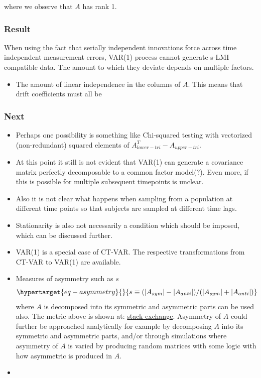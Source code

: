 \documentclass[
  letterpaper,
  DIV=11,
  numbers=noendperiod]{scrartcl}
\let\oldparagraph\paragraph
\renewcommand{\paragraph}[1]{\oldparagraph{#1}\mbox{}}
\providecommand{\tightlist}{%
  \setlength{\itemsep}{0pt}\setlength{\parskip}{0pt}}\usepackage{longtable,booktabs,array}
\begin{document}
where we observe that \(A\) has rank 1.

\hypertarget{result}{%
\subsubsection{Result}\label{result}}

When using the fact that serially independent innovations force across
time independent measurement errors, VAR(1) process cannot generate
s-LMI compatible data. The amount to which they deviate depends on
multiple factors.

\begin{itemize}
\tightlist
\item
  The amount of linear independence in the columns of \(A\). This means
  that drift coefficients must all be
\end{itemize}

\hypertarget{next}{%
\subsubsection{Next}\label{next}}

\begin{itemize}
\tightlist
\item
  Perhaps one possibility is something like Chi-squared testing with
  vectorized (non-redundant) squared elements of
  \(A_{lower-tri}^T-A_{upper-tri}\).
\item
  At this point it still is not evident that VAR(1) can generate a
  covariance matrix perfectly decomposable to a common factor model(?).
  Even more, if this is possible for multiple subsequent timepoints is
  unclear.
\item
  Also it is not clear what happens when sampling from a population at
  different time points so that subjects are sampled at different time
  lags.
\item
  Stationarity is also not necessarily a condition which should be
  imposed, which can be discussed further.
\item
  VAR(1) is a special case of CT-VAR. The respective transformations
  from CT-VAR to VAR(1) are available.
\item
  Measures of asymmetry such as \(s\)
  \begin{equation}\protect\hypertarget{eq-asymmetry}{}{
  s \equiv (|A_{sym}|-|A_{anti}|)/(|A_{sym}|+|A_{anti}|)
  }\label{eq-asymmetry}\end{equation} where \(A\) is decomposed into its
  symmetric and asymmetric parts can be used also. The metric above is
  shown at:
  \href{https://math.stackexchange.com/questions/2048817/metric-for-how-symmetric-a-matrix-is}{stack
  exchange}. Asymmetry of \(A\) could further be approached analytically
  for example by decomposing \(A\) into its symmetric and asymmetric
  parts, and/or through simulations where asymmetry of \(A\) is varied
  by producing random matrices with some logic with how asymmetric is
  produced in \(A\).
\item
\end{itemize}

\hypertarget{section}{%
\paragraph{}\label{section}}
\end{document}

